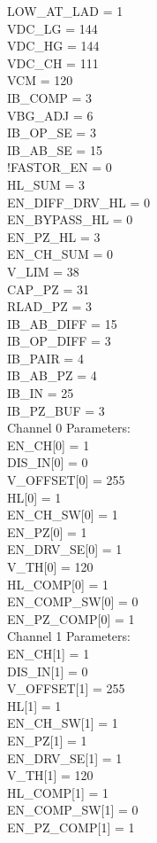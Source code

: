 LOW\_AT_LAD     = 1\\
VDC\_LG         = 144\\
VDC\_HG         = 144\\
VDC\_CH         = 111\\
VCM            = 120\\
IB\_COMP        = 3\\
VBG\_ADJ        = 6\\
IB\_OP_SE       = 3\\
IB\_AB_SE       = 15\\
!FASTOR\_EN     = 0\\
HL\_SUM         = 3\\
EN\_DIFF_DRV_HL = 0\\
EN\_BYPASS_HL   = 0\\
EN\_PZ_HL       = 3\\
EN\_CH_SUM      = 0\\
V\_LIM          = 38\\
CAP\_PZ         = 31\\
RLAD\_PZ        = 3\\
IB\_AB_DIFF     = 15\\
IB\_OP_DIFF     = 3\\
IB\_PAIR        = 4\\
IB\_AB_PZ       = 4\\
IB\_IN          = 25\\
IB\_PZ_BUF      = 3\\

Channel 0 Parameters:\\

EN\_CH[0]      = 1\\
DIS\_IN[0]     = 0\\
V\_OFFSET[0]   = 255\\
HL[0]         = 1\\
EN\_CH_SW[0]   = 1\\
EN\_PZ[0]      = 1\\
EN\_DRV_SE[0]  = 1\\
V\_TH[0]       = 120\\
HL\_COMP[0]    = 1\\
EN\_COMP_SW[0] = 0\\
EN\_PZ_COMP[0] = 1\\

Channel 1 Parameters:\\

EN\_CH[1]      = 1\\
DIS\_IN[1]     = 0\\
V\_OFFSET[1]   = 255\\
HL[1]         = 1\\
EN\_CH_SW[1]   = 1\\
EN\_PZ[1]      = 1\\
EN\_DRV_SE[1]  = 1\\
V\_TH[1]       = 120\\
HL\_COMP[1]    = 1\\
EN\_COMP_SW[1] = 0\\
EN\_PZ_COMP[1] = 1\\

